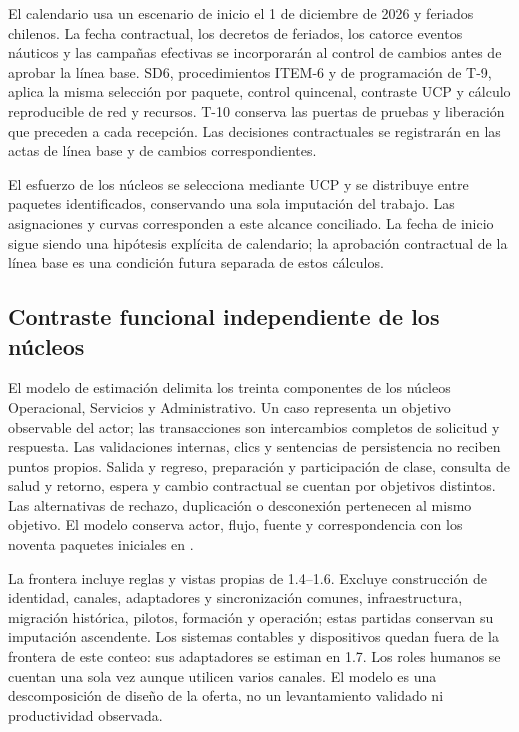 El calendario usa un escenario de inicio el 1 de diciembre de 2026 y feriados chilenos. La fecha contractual, los decretos de feriados, los catorce eventos náuticos y las campañas efectivas se incorporarán al control de cambios antes de aprobar la línea base. SD6, procedimientos ITEM-6 y de programación de T-9, aplica la misma selección por paquete, control quincenal, contraste UCP y cálculo reproducible de red y recursos. T-10 conserva las puertas de pruebas y liberación que preceden a cada recepción. Las decisiones contractuales se registrarán en las actas de línea base y de cambios correspondientes.

El esfuerzo de los núcleos se selecciona mediante UCP y se distribuye entre paquetes identificados, conservando una sola imputación del trabajo. Las asignaciones y curvas corresponden a este alcance conciliado. La fecha de inicio sigue siendo una hipótesis explícita de calendario; la aprobación contractual de la línea base es una condición futura separada de estos cálculos.




\subsection{Contraste funcional independiente de los núcleos} %
El modelo de estimación delimita los treinta componentes de los núcleos Operacional, Servicios y Administrativo. Un caso representa un objetivo observable del actor; las transacciones son intercambios completos de solicitud y respuesta. Las validaciones internas, clics y sentencias de persistencia no reciben puntos propios. Salida y regreso, preparación y participación de clase, consulta de salud y retorno, espera y cambio contractual se cuentan por objetivos distintos. Las alternativas de rechazo, duplicación o desconexión pertenecen al mismo objetivo. El modelo conserva actor, flujo, fuente y correspondencia con los noventa paquetes iniciales en .

La frontera incluye reglas y vistas propias de 1.4--1.6. Excluye construcción de identidad, canales, adaptadores y sincronización comunes, infraestructura, migración histórica, pilotos, formación y operación; estas partidas conservan su imputación ascendente. Los sistemas contables y dispositivos quedan fuera de la frontera de este conteo: sus adaptadores se estiman en 1.7. Los roles humanos se cuentan una sola vez aunque utilicen varios canales. El modelo es una descomposición de diseño de la oferta, no un levantamiento validado ni productividad observada.

